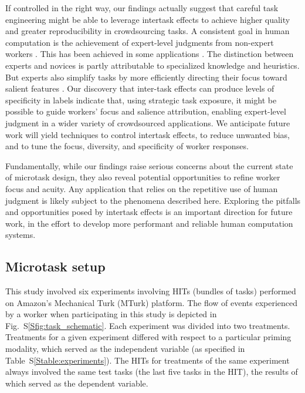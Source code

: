 \documentclass{pnastwo}
\begin{document}
\begin{article}
If controlled in the right way, our findings actually suggest that careful task
engineering might be able to leverage intertask effects to achieve higher 
quality and greater reproducibility in crowdsourcing tasks.  A consistent goal
in human computation is the achievement of expert-level judgments from
non-expert workers \cite{kittur2011crowdforge}.  This has been achieved in some
applications \cite{snow2008cheap,Mortensen20131020,Warby2014385}.  The
distinction between experts and novices is partly attributable to specialized
knowledge and heuristics.  But experts also simplify tasks by more efficiently
directing their focus toward salient features \cite{kellman2009perceptual}.
Our discovery that inter-task effects can produce levels of specificity in
labels indicate that, using strategic task exposure, it might be possible to
guide workers' focus and salience attribution, enabling expert-level judgment
in a wider variety of crowdsourced applications.  We anticipate future work
will yield techniques to control intertask effects, to reduce unwanted bias,
and to tune the focus, diversity, and specificity of worker responses.

Fundamentally, while our findings raise serious concerns about the current
state of microtask design, they also reveal potential opportunities to refine
worker focus and acuity.  Any application that relies on the repetitive use of
human judgment is likely subject to the phenomena described here.  Exploring
the pitfalls and opportunities posed by intertask effects is an important
direction for future work, in the effort to develop more performant and
reliable human computation systems.

\begin{materials}

\section{Microtask setup} This study involved six experiments involving HITs
(bundles of tasks) performed on Amazon's Mechanical Turk (MTurk) platform.  The
flow of events experienced by a worker when participating in this study is
depicted in Fig.~S\ref{Sfig:task_schematic}.  Each experiment was divided into
two treatments.  Treatments for a given experiment differed with respect to a
particular priming modality, which served as the independent variable (as
specified in Table~S\ref{Stable:experiments}).  The HITs for treatments of the
same experiment always involved the same test tasks (the last five tasks in the
HIT), the results of which served as the dependent variable.


\end{materials}
\end{article}
\end{document}
